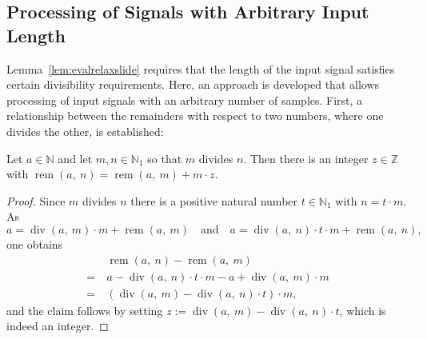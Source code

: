 \documentclass[journal]{IEEEtran}
\newcommand{\N}{\mathbb{N}}
\newcommand{\Z}{\mathbb{Z}}
\renewcommand{\div}[2]{\operatorname{div}(#1,\ #2)}
\newcommand{\rem}[2]{\operatorname{rem}(#1,\ #2)}
\begin{document}
\subsection{Processing of Signals with Arbitrary Input Length}
Lemma~\ref{lem:evalrelaxslide} requires that the length of the input signal satisfies certain divisibility requirements.
Here, an approach is developed that allows processing of input signals with an arbitrary number of samples.
First, a relationship between the remainders with respect to two numbers, where one divides the other, is established:
\begin{lemma}
\label{lem:remdiv}
Let $a\in\N$ and let $m,n\in\N_1$ so that $m$ divides $n$.
Then there is an integer $z\in\Z$ with $\rem{a}{n} = \rem{a}{m} + m\cdot z$.
\end{lemma}\begin{proof}
Since $m$ divides $n$ there is a positive natural number $t\in\N_1$ with $n = t\cdot m$.
As
\begin{displaymath}
  a = \div{a}{m}\cdot m + \rem{a}{m}
  \quad\text{and}\quad
  a = \div{a}{n}\cdot t\cdot m + \rem{a}{n}\text{,}
\end{displaymath}
one obtains
\begin{align*}
  &\rem{a}{n} - \rem{a}{m}\\
  =\ & a - \div{a}{n}\cdot t\cdot m - a + \div{a}{m}\cdot m\\
  =\ & (\div{a}{m} - \div{a}{n}\cdot t)\cdot m\text{,}
\end{align*}
and the claim follows by setting $z := \div{a}{m} - \div{a}{n}\cdot t$, which is indeed an integer.
\end{proof}
\end{document}
